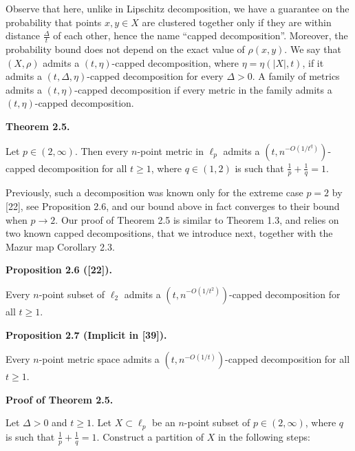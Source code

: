 \par
\par
Observe that here, unlike in Lipschitz decomposition, we have a guarantee on the probability that points $x,y\in X$ are clustered together only if they are within distance $\frac{\Delta}{t}$ of each other, hence the name “capped decomposition”. Moreover, the probability bound does not depend on the exact value of $\rho(x,y)$. We say that $(X,\rho)$ admits a $(t,\eta)$-capped decomposition, where $\eta=\eta(|X|,t)$, if it admits a $(t,\Delta,\eta)$-capped decomposition for every $\Delta>0$. A family of metrics admits a $(t,\eta)$-capped decomposition if every metric in the family admits a $(t,\eta)$-capped decomposition.
\par
\par
\par\medskip\noindent\textbf{Theorem 2.5.}\par
Let $p\in(2,\infty)$. Then every $n$-point metric in $\ell_{p}$ admits a $(t,n^{-O(1/t^{q})})$-capped decomposition for all $t\geq 1$, where $q\in(1,2)$ is such that $\frac{1}{p}+\frac{1}{q}=1$.
\par
\par
\par
Previously, such a decomposition was known only for the extreme case $p=2$ by [22], see Proposition 2.6, and our bound above in fact converges to their bound when $p\to 2$. Our proof of Theorem 2.5 is similar to Theorem 1.3, and relies on two known capped decompositions, that we introduce next, together with the Mazur map Corollary 2.3.
\par
\par
\par\medskip\noindent\textbf{Proposition 2.6 ([22]).}\par
Every $n$-point subset of $\ell_{2}$ admits a $(t,n^{-O(1/t^{2})})$-capped decomposition for all $t\geq 1$.
\par
\par
\par
\par\medskip\noindent\textbf{Proposition 2.7 (Implicit in [39]).}\par
Every $n$-point metric space admits a $(t,n^{-O(1/t)})$-capped decomposition for all $t\geq 1$.
\par
\par
\par
\par\medskip\noindent\textbf{Proof of Theorem 2.5.}\par
Let $\Delta>0$ and $t\geq 1$. Let $X\subset\ell_{p}$ be an $n$-point subset of $p\in(2,\infty)$, where $q$ is such that $\frac{1}{p}+\frac{1}{q}=1$. Construct a partition of $X$ in the following steps:
